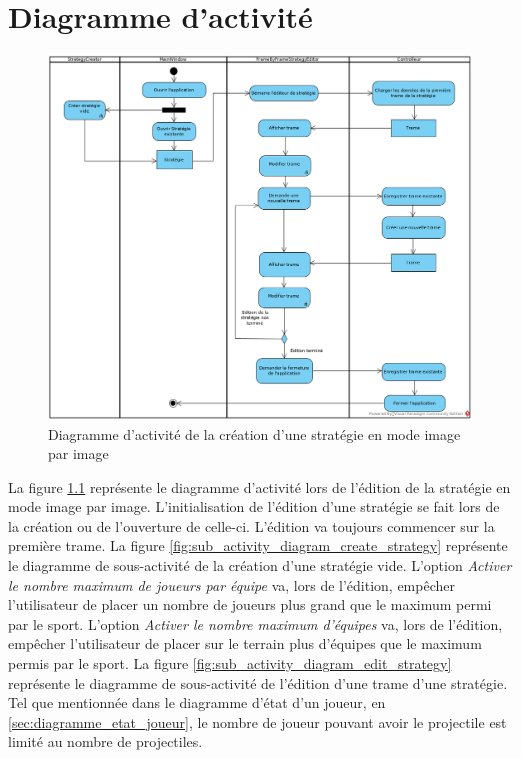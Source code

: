 
\chapter{Diagramme d'activité}
\label{s:diagramme_activite}

\begin{figure}[htpb]
    \centering
    \includegraphics[scale=0.60]{fig/activity_diagram_imagepimage.png}
    \caption{Diagramme d'activité de la création d'une stratégie en mode image par image}
    \label{fig:activity_diagram_imagepimage}
\end{figure}

La figure \ref{fig:activity_diagram_imagepimage} représente le diagramme d'activité lors de l'édition de la stratégie en mode image par image.
L'initialisation de l'édition d'une stratégie se fait lors de la création ou de l'ouverture de celle-ci.
L'édition va toujours commencer sur la première trame.
La figure \ref{fig:sub_activity_diagram_create_strategy} représente le diagramme de sous-activité de la création d'une stratégie vide.
L'option \textit{Activer le nombre maximum de joueurs par équipe} va, lors de l'édition, empêcher l'utilisateur de placer un nombre de joueurs plus grand que le maximum permi par le sport.
L'option \textit{Activer le nombre maximum d'équipes} va, lors de l'édition, empêcher l'utilisateur de placer sur le terrain plus d'équipes que le maximum permis par le sport.
La figure \ref{fig:sub_activity_diagram_edit_strategy} représente le diagramme de sous-activité de l'édition d'une trame d'une stratégie.
Tel que mentionnée dans le diagramme d'état d'un joueur, en \ref{sec:diagramme_etat_joueur}, le nombre de joueur pouvant avoir le projectile est limité au nombre de projectiles.

